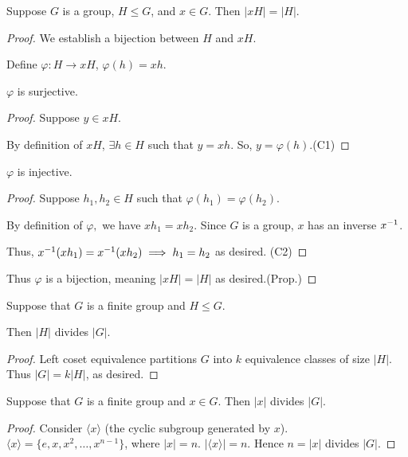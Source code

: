 \documentclass[notes.tex]{subfiles}
\begin{document}
\begin{proposition}
	Suppose $G$ is a group, $H\le G$, and $x\in G$. Then $|xH| = |H|$.
\end{proposition}
\begin{proof}
	We establish a bijection between $H$ and $xH$.

	Define $\varphi:H\to xH$, $\varphi(h) = xh$.

	\begin{claim}[1]
	 	$\varphi$ is surjective.
	 \end{claim}
	 \begin{proof}
	 	Suppose $y \in xH$.

	 	By definition of $xH$, $\exists h\in H$ such that $y=xh$. So, $y=\varphi(h)$.\qedhere(C1)
	 \end{proof}
	 \begin{claim}[2]
	 	$\varphi$ is injective.
	 \end{claim}
	 \begin{proof}
	 	Suppose $h_1, h_2\in H$ such that $\varphi(h_1) = \varphi(h_2)$.

		By definition of $\varphi,$ we have $xh_1 = xh_2$. Since $G$ is a group, $x$ has an inverse ${x}^{-1}$.

		Thus, ${x}^{-1}(xh_1) = {x}^{-1}(xh_2)\implies h_1=h_2$ as desired. \qedhere(C2)
	 \end{proof}

	Thus $\varphi$ is a bijection, meaning $|xH| = |H|$ as desired.\qedhere(Prop.)
\end{proof}

\begin{theorem}[Lagrange]
	Suppose that $G$ is a finite group and $H\le G$.

	Then $|H|$ divides $|G|$.
\end{theorem}
\begin{proof}
	Left coset equivalence partitions $G$ into $k$ equivalence classes of size $|H|$. \\
\hspace{3em}
	Thus $|G| = k|H|$, as desired.
\end{proof}

\begin{corollary}
	Suppose that $G$ is a finite group and $x\in G$. Then $|x|$ divides $|G|$.
\end{corollary}

\begin{proof}
	Consider $\langle x\rangle$ (the cyclic subgroup generated by $x$).
	$\langle x\rangle = \{e, x, x^2, \ldots, x^{n-1}\}$, where $|x| = n$. $|\langle x\rangle| = n$. Hence $n = |x|$ divides $|G|$.
\end{proof}
\end{document}
